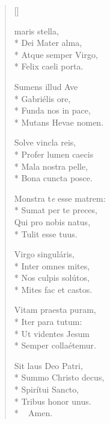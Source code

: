 \newHymn



\settowidth{\versewidth}{Ave maris stella..}

\pointtrans


\begin{multicols}{2}
\begin{verse}[\versewidth]

 maris stella, \\*
Dei Mater alma,   \\*      
Atque semper Virgo, \\*    
Felix caeli porta.      
\pointtrans

Sumens illud Ave        \\*
Gabriélis ore,          \\*
Funda nos in pace,      \\*
Mutans Hevae nomen.     

Solve vincla reis,     \\*
Profer lumen caecis     \\*
Mala nostra pelle,      \\*
Bona cuncta posce.      

Monstra t\textit{e} esse matrem: \\*
Sumat per te preces,    \\
Qui pro nobis natus,    \\*
Tulit esse tuus.        
                 

Virgo singuláris,       \\*
Inter omnes mites,      \\*
Nos culpis solútos,     \\*
Mites fac et castos.    

Vitam praesta puram,    \\*
Iter para tutum:        \\*
Ut videntes Jesum       \\*
Semper collaétemur.     

Sit laus Deo Patri,     \\*
Summo Christo decus,    \\*
Spirítui Sancto,        \\*
Tribus honor unus.\\*
 ~ \quad Amen.

\end{verse}
\end{multicols}


